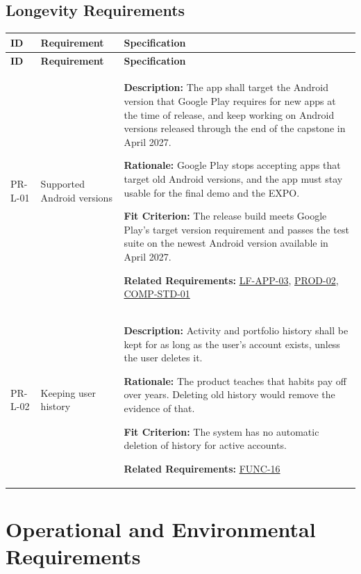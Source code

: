 \documentclass[12pt]{article}
\begin{document}
\subsection{Longevity Requirements}

\small
\setlength{\tabcolsep}{4pt}
\begin{xltabular}{\textwidth}{|p{2.6cm}|p{3.4cm}|X|}
\hline
\textbf{ID} & \textbf{Requirement} & \textbf{Specification} \\
\hline
\endfirsthead
\hline
\textbf{ID} & \textbf{Requirement} & \textbf{Specification} \\
\hline
\endhead

PR-L-01\hypertarget{req:PR-L-01}{} &
Supported Android versions &
\textbf{Description:} The app shall target the Android version that Google Play requires for new apps at the time of release, and keep working on Android versions released through the end of the capstone in April 2027.

\textbf{Rationale:} Google Play stops accepting apps that target old Android versions, and the app must stay usable for the final demo and the EXPO.

\textbf{Fit Criterion:} The release build meets Google Play's target version requirement and passes the test suite on the newest Android version available in April 2027.

\textbf{Related Requirements:} \hyperlink{req:LF-APP-03}{LF-APP-03}, \hyperlink{req:PROD-02}{PROD-02}, \hyperlink{req:COMP-STD-01}{COMP-STD-01}\\
\hline

PR-L-02\hypertarget{req:PR-L-02}{} &
Keeping user history &
\textbf{Description:} Activity and portfolio history shall be kept for as long as the user's account exists, unless the user deletes it.

\textbf{Rationale:} The product teaches that habits pay off over years. Deleting old history would remove the evidence of that.

\textbf{Fit Criterion:} The system has no automatic deletion of history for active accounts.

\textbf{Related Requirements:} \hyperlink{req:FUNC-16}{FUNC-16}\\
\hline

\end{xltabular}

\section{Operational and Environmental Requirements}
\end{document}
